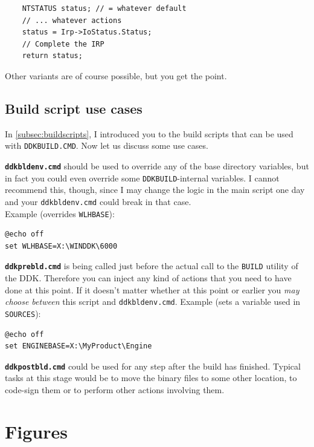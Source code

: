 \documentclass[a4paper,titlepage]{report}
\begin{document}
\begin{verbatim}
    NTSTATUS status; // = whatever default
    // ... whatever actions
    status = Irp->IoStatus.Status;
    // Complete the IRP
    return status;
\end{verbatim}

Other variants are of course possible, but you get the point.

\section{Build script use cases}
In \autoref{subsec:buildscripts}, I introduced you to the build scripts that can be used with
\texttt{DDKBUILD.CMD}. Now let us discuss some use cases.

\textbf{\texttt{ddkbldenv.cmd}} should be used to override any of the base directory variables, but
in fact you could even override some \texttt{DDKBUILD}-internal variables. I cannot recommend
this, though, since I may change the logic in the main script one day and your \texttt{ddkbldenv.cmd}
could break in that case.\\

Example (overrides \texttt{WLHBASE}):

\begin{verbatim}
@echo off
set WLHBASE=X:\WINDDK\6000
\end{verbatim}

\textbf{\texttt{ddkprebld.cmd}} is being called just before the actual call to the \texttt{BUILD}
utility of the DDK. Therefore you can inject any kind of actions that you need to have done at this
point. If it doesn't matter whether at this point or earlier you \emph{may choose between} this script
and \texttt{ddkbldenv.cmd}. Example (sets a variable used in \texttt{SOURCES}):

\begin{verbatim}
@echo off
set ENGINEBASE=X:\MyProduct\Engine
\end{verbatim}

\textbf{\texttt{ddkpostbld.cmd}} could be used for any step after the build has finished. Typical
tasks at this stage would be to move the binary files to some other location, to code-sign
them or to perform other actions involving them.

\chapter{Figures}\thispagestyle{fancy}
\end{document}
